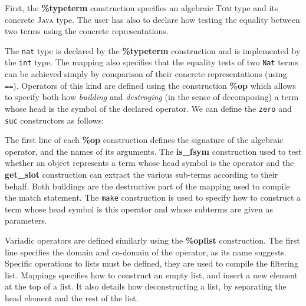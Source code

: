 \documentclass[runningheads]{llncs}
\newcommand{\tom}{\textsc{Tom}}
\newcommand{\java}{\textsc{Java}}
\newcommand{\lex}[1]{{\textrm{\textbf{#1}}}}
\begin{document}
First, the \lex{\%typeterm} construction specifies an algebraic {\tom} type and
its concrete {\java} type. The user has also to declare how testing the
equality between two terms using the concrete representations.

\medskip
{}

The \texttt{nat} type is declared by the \lex{\%typeterm} construction and is
implemented by the \texttt{int} type. The mapping also specifies that the
equality tests of two \texttt{Nat} terms can be achieved simply by comparison
of their concrete representations (using \texttt{==}). Operators of this kind
are defined using the construction \lex{\%op} which allows to specify both how
\emph{building} and \emph{destroying} (in the sense of decomposing) a term
whose head is the symbol of the declared operator. We can define the
\texttt{zero} and \texttt{suc} constructors as follows:


	
The first line of each \lex{\%op} construction defines the signature of the
algebraic operator, and the names of its arguments. The \lex{is\_fsym}
construction used to test whether an object represents a term whose head symbol
is the operator and the \lex{get\_slot} construction can extract the various
sub-terms according to their behalf. Both buildings are the destructive part of
the mapping used to compile the match statement.  The \texttt{make} construction
is used to specify how to construct a term whose head symbol is this operator
and whose subterms are given as parameters.

Variadic operators are defined similarly using the \lex{\%oplist} construction.
The first line specifies the domain and co-domain of the operator, as its name
suggests. Specific operations to lists must be defined, they are used to
compile the filtering list. Mappings specifies how to construct an empty list,
and insert a new element at the top of a list. It also details how
deconstructing a list, by separating the head element and the rest of
the list.
\end{document}
